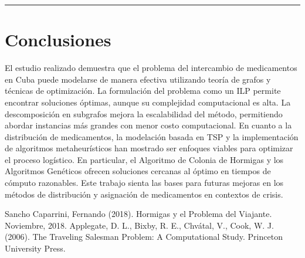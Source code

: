 \documentclass[twocolumn, fontsize=10pt]{article}
\begin{document}
\rule{\linewidth}{0.5pt}

\section{Conclusiones}

El estudio realizado demuestra que el problema del intercambio de medicamentos en Cuba puede modelarse de manera efectiva utilizando teoría de grafos y técnicas de optimización. La formulación del problema como un ILP permite encontrar soluciones óptimas, aunque su complejidad computacional es alta. La descomposición en subgrafos mejora la escalabilidad del método, permitiendo abordar instancias más grandes con menor costo computacional. En cuanto a la distribución de medicamentos, la modelación basada en TSP y la implementación de algoritmos metaheurísticos han mostrado ser enfoques viables para optimizar el proceso logístico. En particular, el Algoritmo de Colonia de Hormigas y los Algoritmos Genéticos ofrecen soluciones cercanas al óptimo en tiempos de cómputo razonables. Este trabajo sienta las bases para futuras mejoras en los métodos de distribución y asignación de medicamentos en contextos de crisis.

\renewcommand\refname{Referencias}

\begin{thebibliography}{}

  \sloppypar
   Sancho Caparrini, Fernando (2018). Hormigas y el Problema del Viajante. Noviembre, 2018.  
   Applegate, D. L., Bixby, R. E., Chvátal, V.,  Cook, W. J. (2006). The Traveling Salesman Problem: A Computational Study. Princeton University Press.  
\end{thebibliography}
\end{document}
